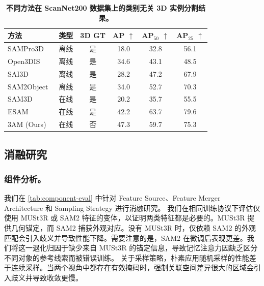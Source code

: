 \begin{table}[t]
\centering
\small
\setlength{\tabcolsep}{2mm}
\vspace{-3mm}
\caption{\textbf{不同方法在 ScanNet200 数据集上的类别无关 3D 实例分割结果。}}
\label{tab:scannet200-class-agnostic}
\vspace{-3mm}
\begin{tabular}{lccccc}
\toprule
方法 & 类型 & 3D GT & AP $\uparrow$ & AP$_{50}$ $\uparrow$ & AP$_{25}$ $\uparrow$ \\
\midrule
SAMPro3D~\cite{xu2025sampro3d} & 离线 & 是 & 18.0 & 32.8 & 56.1 \\
Open3DIS~\cite{nguyen2024open3dis} & 离线 & 是 & \cellcolor{yellow!25}34.6 & 43.1 & 48.5 \\
SAI3D~\cite{yin2024sai3d} & 离线 & 是 & 28.2 & 47.2 & 67.9 \\
SAM2Object~\cite{zhao2025sam2object} & 离线 & 是 & 34.0 & \cellcolor{yellow!25}52.7 & \cellcolor{yellow!25}70.3 \\
\midrule
SAM3D~\cite{yang2023sam3d} & 在线 & 是 & 20.2 & 35.7 & 55.5 \\
ESAM~\cite{xu2024esam} & 在线 & 是 & \cellcolor{orange!25}42.2 & \cellcolor{red!25}63.7 & \cellcolor{red!25}79.6 \\
\midrule
3AM (Ours) & 在线 & 否 & \cellcolor{red!25}47.3 & \cellcolor{orange!25}59.7 & \cellcolor{orange!25}75.3 \\
\bottomrule
\end{tabular}
\vspace{-3mm}
\end{table}


\vspace{-0.5em}
\subsection{消融研究}
\vspace{-0.5em}

\subsubsection{组件分析。}
我们在 \cref{tab:component-eval} 中针对 Feature Source、Feature Merger Architecture 和 Sampling Strategy 进行消融研究。
我们在相同训练协议下评估仅使用 MUSt3R 或 SAM2 特征的变体，以证明两类特征都是必要的。MUSt3R 提供几何锚定，而 SAM2 捕获外观对应。没有 MUSt3R 时，仅依赖 SAM2 的外观匹配会引入歧义并导致性能下降。需要注意的是，SAM2 在微调后表现更差。我们将这一退化归因于缺少来自 MUSt3R 的锚定信息，导致记忆注意力因缺乏区分不同对象的参考线索而被错误训练。
关于采样策略，朴素应用随机采样的性能差于连续采样。当两个视角中都存在有效掩码时，强制关联空间差异很大的区域会引入歧义并导致收敛更慢。

